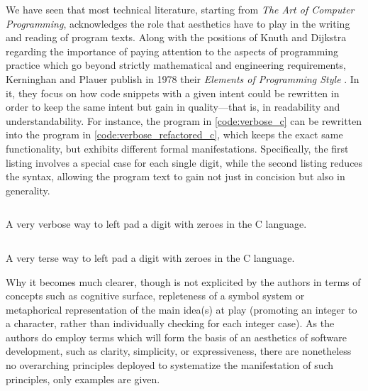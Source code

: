 We have seen that most technical literature, starting from \emph{The Art of Computer Programming}, acknowledges the role that aesthetics have to play in the writing and reading of program texts. Along with the positions of Knuth and Dijkstra regarding the importance of paying attention to the aspects of programming practice \citep{dijkstra_chapter_1972} which go beyond strictly mathematical and engineering requirements, Kerninghan and Plauer publish in 1978 their \emph{Elements of Programming Style} \citep{kernighan_elements_1978}. In it, they focus on how code snippets with a given intent could be rewritten in order to keep the same intent but gain in quality—that is, in readability and understandability. For instance, the program in \autoref{code:verbose_c} can be rewritten into the program in \autoref{code:verbose_refactored_c}, which keeps the exact same functionality, but exhibits different formal manifestations. Specifically, the first listing involves a special case for each single digit, while the second listing reduces the syntax, allowing the program text to gain not just in concision but also in generality.

\begin{listing}
    \inputminted{c}{./corpus/verbose.c}
    \caption{A very verbose way to left pad a digit with zeroes in the C language.}
    \label{code:verbose_c}
\end{listing}

\begin{listing}
    \inputminted{c}{./corpus/verbose_refactored.c}
    \caption{A very terse way to left pad a digit with zeroes in the C language.}
    \label{code:verbose_refactored_c}
\end{listing}

Why it becomes much clearer, though is not explicited by the authors in terms of concepts such as cognitive surface, repleteness of a symbol system or metaphorical representation of the main idea(s) at play (promoting an integer to a character, rather than individually checking for each integer case). As the authors do employ terms which will form the basis of an aesthetics of software development, such as clarity, simplicity, or expressiveness, there are nonetheless no overarching principles deployed to systematize the manifestation of such principles, only examples are given.

